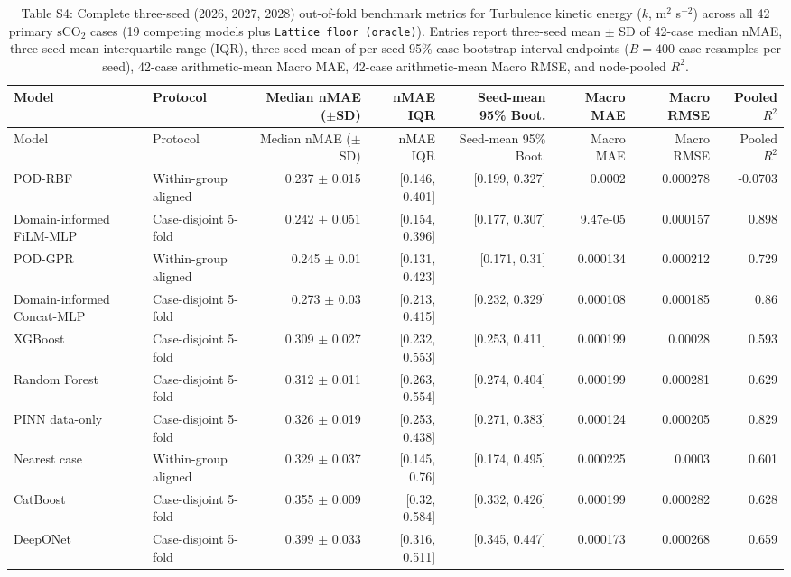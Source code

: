 \begin{landscape}\scriptsize
\begin{longtable}{p{3.8cm}p{2.9cm}rrrrrr}
\caption{Table S4: Complete three-seed (2026, 2027, 2028) out-of-fold benchmark metrics for Turbulence kinetic energy ($k$, m$^2$ s$^{-2}$) across all 42 primary $\mathrm{sCO}_2$ cases (19 competing models plus \texttt{Lattice floor (oracle)}). Entries report three-seed mean $\pm$ SD of 42-case median nMAE, three-seed mean interquartile range (IQR), three-seed mean of per-seed 95\% case-bootstrap interval endpoints ($B=400$ case resamples per seed), 42-case arithmetic-mean Macro MAE, 42-case arithmetic-mean Macro RMSE, and node-pooled $R^2$.}\\
\toprule Model & Protocol & Median nMAE ($\pm$SD) & nMAE IQR & Seed-mean 95\% Boot. & Macro MAE & Macro RMSE & Pooled $R^2$\\
\midrule\endfirsthead
\toprule Model & Protocol & Median nMAE ($\pm$SD) & nMAE IQR & Seed-mean 95\% Boot. & Macro MAE & Macro RMSE & Pooled $R^2$\\
\midrule\endhead
POD-RBF & Within-group aligned & 0.237 $\pm$ 0.015 & [0.146, 0.401] & [0.199, 0.327] & 0.0002 & 0.000278 & -0.0703 \\
Domain-informed FiLM-MLP & Case-disjoint 5-fold & 0.242 $\pm$ 0.051 & [0.154, 0.396] & [0.177, 0.307] & 9.47e-05 & 0.000157 & 0.898 \\
POD-GPR & Within-group aligned & 0.245 $\pm$ 0.01 & [0.131, 0.423] & [0.171, 0.31] & 0.000134 & 0.000212 & 0.729 \\
Domain-informed Concat-MLP & Case-disjoint 5-fold & 0.273 $\pm$ 0.03 & [0.213, 0.415] & [0.232, 0.329] & 0.000108 & 0.000185 & 0.86 \\
XGBoost & Case-disjoint 5-fold & 0.309 $\pm$ 0.027 & [0.232, 0.553] & [0.253, 0.411] & 0.000199 & 0.00028 & 0.593 \\
Random Forest & Case-disjoint 5-fold & 0.312 $\pm$ 0.011 & [0.263, 0.554] & [0.274, 0.404] & 0.000199 & 0.000281 & 0.629 \\
PINN data-only & Case-disjoint 5-fold & 0.326 $\pm$ 0.019 & [0.253, 0.438] & [0.271, 0.383] & 0.000124 & 0.000205 & 0.829 \\
Nearest case & Within-group aligned & 0.329 $\pm$ 0.037 & [0.145, 0.76] & [0.174, 0.495] & 0.000225 & 0.0003 & 0.601 \\
CatBoost & Case-disjoint 5-fold & 0.355 $\pm$ 0.009 & [0.32, 0.584] & [0.332, 0.426] & 0.000199 & 0.000282 & 0.628 \\
DeepONet & Case-disjoint 5-fold & 0.399 $\pm$ 0.033 & [0.316, 0.511] & [0.345, 0.447] & 0.000173 & 0.000268 & 0.659 \\

\end{longtable}
\end{landscape}
